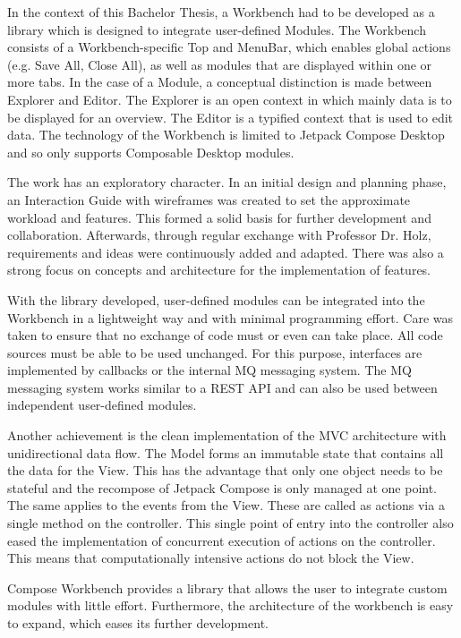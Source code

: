 In the context of this Bachelor Thesis, a Workbench had to be developed as a library which is designed to integrate user-defined Modules. The Workbench consists of a Workbench-specific Top and MenuBar, which enables global actions (e.g. Save All, Close All), as well as modules that are displayed within one or more tabs. 
In the case of a Module, a conceptual distinction is made between Explorer and Editor. The Explorer is an open context in which mainly data is to be displayed for an overview. The Editor is a typified context that is used to edit data.
The technology of the Workbench is limited to Jetpack Compose Desktop and so only supports Composable Desktop modules. 

The work has an exploratory character. In an initial design and planning phase, an Interaction Guide with wireframes was created to set the approximate workload and features. This formed a solid basis for further development and collaboration. Afterwards, through regular exchange with Professor Dr. Holz, requirements and ideas were continuously added and adapted. 
There was also a strong focus on concepts and architecture for the implementation of features.

With the library developed, user-defined modules can be integrated into the Workbench in a lightweight way and with minimal programming effort. Care was taken to ensure that no exchange of code must or even can take place. All code sources must be able to be used unchanged.
For this purpose, interfaces are implemented by callbacks or the internal MQ messaging system. The MQ messaging system works similar to a REST API and can also be used between independent user-defined modules.

Another achievement is the clean implementation of the MVC architecture with unidirectional data flow. The Model forms an immutable state that contains all the data for the View. This has the advantage that only one object needs to be stateful and the recompose of Jetpack Compose is only managed at one point.
The same applies to the events from the View. These are called as actions via a single method on the controller. This single point of entry into the controller also eased the implementation of concurrent execution of actions on the controller. This means that computationally intensive actions do not block the View.

Compose Workbench provides a library that allows the user to integrate custom modules with little effort. 
Furthermore, the architecture of the workbench is easy to expand, which eases its further development.